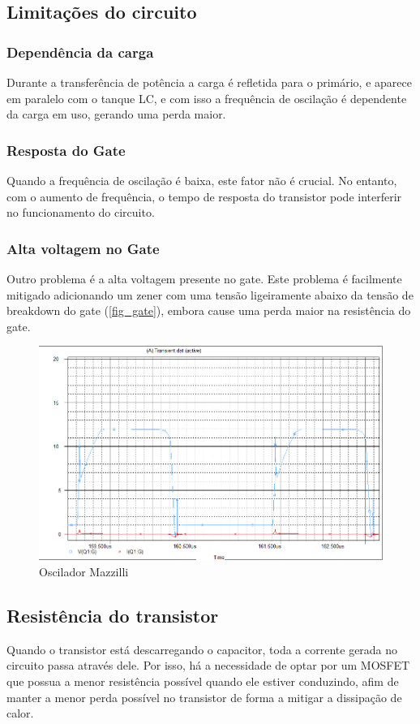 \subsection{Limitações do circuito}

\subsubsection{Dependência da carga}
Durante a transferência de potência a carga é refletida para o primário, e aparece em paralelo com o tanque LC, e com isso a frequência de oscilação é dependente da carga em uso, gerando uma perda maior.
\subsubsection{Resposta do Gate}
Quando a frequência de oscilação é baixa, este fator não é crucial. No entanto, com o aumento de frequência, o tempo de resposta do transistor pode interferir no funcionamento do circuito.

\subsubsection{Alta voltagem no Gate}
Outro problema é a alta voltagem presente no gate. Este problema é facilmente mitigado adicionando um zener com uma tensão ligeiramente abaixo da tensão de breakdown do gate (\autoref{fig_gate}), embora cause uma perda maior na resistência do gate.

\begin{figure}[htb]
\caption{\label{fig_gate}Oscilador Mazzilli}
\begin{center}
\includegraphics[scale=0.5]{images/gate.png}
\end{center}
\end{figure}

\subsection{Resistência do transistor}
Quando o transistor está descarregando o capacitor, toda a corrente gerada no circuito passa através dele. Por isso, há a necessidade de optar por um MOSFET que possua a menor resistência possível quando ele estiver conduzindo, afim de manter a menor perda possível no transistor de forma a mitigar a dissipação de calor.